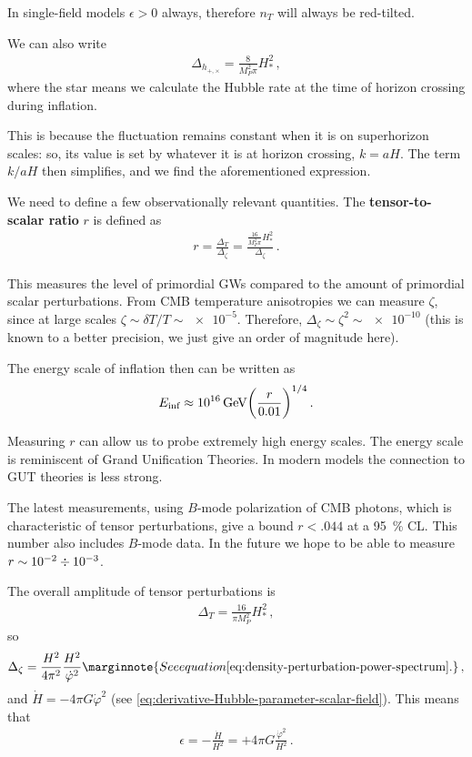 \documentclass[main.tex]{subfiles}
\begin{document}
In single-field models \(\epsilon > 0\) always, therefore \(n_T \) will always be red-tilted. 

We can also write 
%
\begin{align}
\Delta_{h_{+, \times }} = \frac{8}{M_P^2 \pi } H^2_*
\,,
\end{align}
%
where the star means we calculate the Hubble rate at the time of horizon crossing during inflation. 

This is because the fluctuation remains constant when it is on superhorizon scales: so, its value is set by whatever it is at horizon crossing, \(k = aH\).
The term \(k / aH\) then simplifies, and we find the aforementioned expression.

We need to define a few observationally relevant quantities. 
The \textbf{tensor-to-scalar ratio} \(r\) is defined as 
%
\begin{align}
r = \frac{\Delta _T}{\Delta _\zeta }
= \frac{ \frac{16}{M_P^2 \pi } H^2_*}{\Delta _\zeta }
\,.
\end{align}

This measures the level of primordial GWs compared to the amount of primordial scalar perturbations. 
From CMB temperature anisotropies we can measure \(\zeta \), since at large scales \(\zeta \sim \delta T / T \sim \num{e-5}\). Therefore, \(\Delta_\zeta \sim \zeta^2 \sim \num{e-10}\) (this is known to a better precision, we just give an order of magnitude here).

The energy scale of inflation then can be written as 
%
\begin{align}
E _{\text{inf}} \approx \SI{e16}{GeV} \qty(\frac{r}{\num{.01}})^{1/4}
\,.
\end{align}

Measuring \(r\) can allow us to probe extremely high energy scales.
The energy scale is reminiscent of Grand Unification Theories. 
In modern models the connection to GUT theories is less strong.

The latest measurements, using \(B\)-mode polarization of CMB photons, which is characteristic of tensor perturbations, give a bound \(r < \num{.044}\) at a \SI{95}{\percent} CL. This number also includes \(B\)-mode data.
In the future we hope to be able to measure \(r \sim \num{e-2} \divisionsymbol \num{e-3}\). 

The overall amplitude of tensor perturbations is 
%
\begin{align}
\Delta _T = \frac{16}{\pi M_P^2} H^2_*
\,,
\end{align}
%
so 
%
\begin{align}
\Delta_{\zeta } = \frac{H^2}{4 \pi^2} \frac{H^2}{\dot{\varphi}^2} 
\marginnote{See equation \eqref{eq:density-perturbation-power-spectrum}.}
\,,
\end{align}
%
and \(\dot{H} = - 4 \pi G \dot{\varphi}^2\) (see \eqref{eq:derivative-Hubble-parameter-scalar-field}). 
This means that 
%
\begin{align}
\epsilon  = - \frac{\dot{H}}{H^2} = + 4 \pi G \frac{\dot{\varphi}^2}{H^2}
\,.
\end{align}
\end{document}
